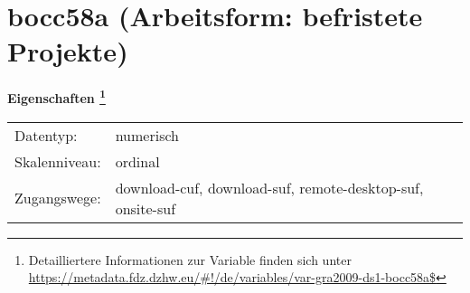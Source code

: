 
    \setcounter{footnote}{0}

    \vspace*{-1.8cm}
	\section{bocc58a (Arbeitsform: befristete Projekte)}
	\label{section:bocc58a}



    \vspace*{0.5cm}
    \noindent\textbf{Eigenschaften
	\footnote{Detailliertere Informationen zur Variable finden sich unter
		\url{https://metadata.fdz.dzhw.eu/\#!/de/variables/var-gra2009-ds1-bocc58a$}}}\\
	\begin{tabularx}{\hsize}{@{}lX}
	Datentyp: & numerisch \\
	Skalenniveau: & ordinal \\
	Zugangswege: &
	  download-cuf, 
	  download-suf, 
	  remote-desktop-suf, 
	  onsite-suf
 \\
    \end{tabularx}




